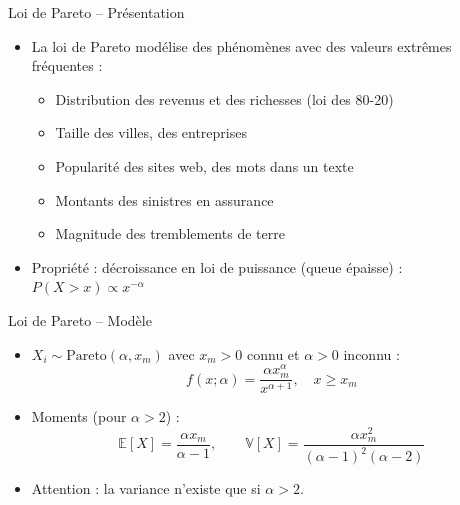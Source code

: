 \documentclass[11pt,aspectratio=169]{beamer}
\begin{document}
\begin{frame}{Loi de Pareto -- Présentation}

\begin{itemize}

\item La loi de Pareto modélise des phénomènes avec des valeurs extrêmes fréquentes :\newline
  \begin{itemize}
    \item Distribution des revenus et des richesses (loi des 80-20)\newline
    \item Taille des villes, des entreprises\newline
    \item Popularité des sites web, des mots dans un texte\newline
    \item Montants des sinistres en assurance\newline
    \item Magnitude des tremblements de terre\newline
  \end{itemize}

\item Propriété : décroissance en loi de puissance (queue épaisse) : $P(X > x) \propto x^{-\alpha}$

\end{itemize}

\end{frame}

\begin{frame}{Loi de Pareto -- Modèle}

\begin{itemize}

\item $X_i \sim \text{Pareto}(\alpha, x_m)$ avec $x_m > 0$ connu et $\alpha > 0$ inconnu :
  \[
  f(x; \alpha) = \frac{\alpha x_m^\alpha}{x^{\alpha+1}}, \quad x \geq x_m
  \]

\item Moments (pour $\alpha > 2$) :
  \[
  \mathbb{E}[X] = \frac{\alpha x_m}{\alpha - 1}, \qquad \mathbb{V}[X] = \frac{\alpha x_m^2}{(\alpha-1)^2(\alpha-2)}
  \]

\item Attention : la variance n'existe que si $\alpha > 2$.

\end{itemize}

\end{frame}
\end{document}
